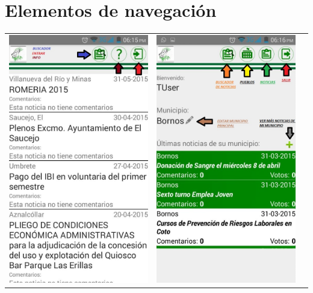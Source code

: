 \section{Elementos de navegación}
\noindent
\begin{tabular}{p{7cm}p{8mm}p{7cm}}
\includegraphics[width=6.5cm]{./android/imagenes/botones1.jpg}
& 
\includegraphics[width=6.5cm]{./android/imagenes/botones2.jpg}

\end{tabular}
